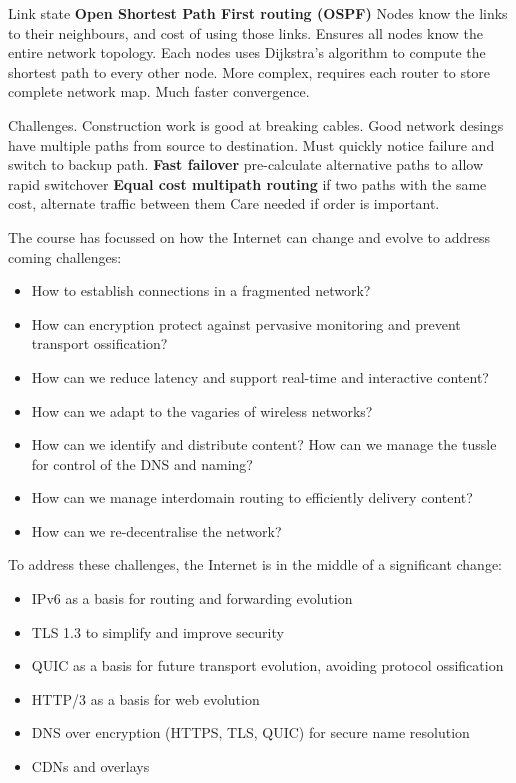 \documentclass{article}
\begin{document}
Link state \- \textbf{Open Shortest Path First routing (OSPF)}
Nodes know the links to their neighbours, and cost of using those links.
Ensures all nodes know the entire network topology.
Each nodes uses Dijkstra's algorithm to compute the shortest path to every other node.
More complex, requires each router to store complete network map. Much faster convergence.

Challenges. Construction work is good at breaking cables. Good network desings have multiple paths from source to destination.
Must quickly notice failure and switch to backup path.
\textbf{Fast failover} \- pre-calculate alternative paths to allow rapid switchover
\textbf{Equal cost multipath routing} \- if two paths with the same cost, alternate traffic between them
Care needed if order is important.




The course has focussed on how the Internet can change and evolve to address coming challenges:

\begin{itemize}
    \item How to establish connections in a fragmented network?
    \item How can encryption protect against pervasive monitoring and prevent transport ossification?
    \item How can we reduce latency and support real-time and interactive content?
    \item How can we adapt to the vagaries of wireless networks?
    \item How can we identify and distribute content? How can we manage the tussle for control of the DNS and naming?
    \item How can we manage interdomain routing to efficiently delivery content?
    \item How can we re-decentralise the network?
\end{itemize}


To address these challenges, the Internet is in the middle of a significant change:

\begin{itemize}
    \item IPv6 as a basis for routing and forwarding evolution
    \item TLS 1.3 to simplify and improve security
    \item QUIC as a basis for future transport evolution, avoiding protocol ossification
    \item HTTP/3 as a basis for web evolution
    \item DNS over encryption (HTTPS, TLS, QUIC) for secure name resolution
    \item CDNs and overlays
\end{itemize}
\end{document}
